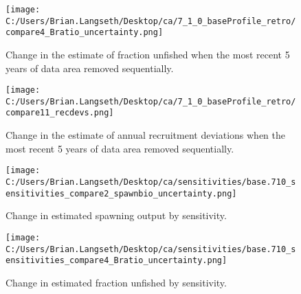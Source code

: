 \documentclass[11pt,
  english,
  a4paper,
]{article}
\begin{document}
\tagmcend\tagstructend


\begin{figure}
\centering
\texttt{[image: C:/Users/Brian.Langseth/Desktop/ca/7\_1\_0\_baseProfile\_retro/compare4\_Bratio\_uncertainty.png]}
\caption{Change in the estimate of fraction unfished when the most recent 5 years of data area removed sequentially.\label{fig:retro-depl}}
\end{figure}

\tagmcend\tagstructend


\begin{figure}
\centering
\texttt{[image: C:/Users/Brian.Langseth/Desktop/ca/7\_1\_0\_baseProfile\_retro/compare11\_recdevs.png]}
\caption{Change in the estimate of annual recruitment deviations when the most recent 5 years of data area removed sequentially.\label{fig:retro-recdevs}}
\end{figure}

\tagmcend\tagstructend


\begin{figure}
\centering
\texttt{[image: C:/Users/Brian.Langseth/Desktop/ca/sensitivities/base.710\_sensitivities\_compare2\_spawnbio\_uncertainty.png]}
\caption{Change in estimated spawning output by sensitivity.\label{fig:sens-ssb}}
\end{figure}

\tagmcend\tagstructend


\begin{figure}
\centering
\texttt{[image: C:/Users/Brian.Langseth/Desktop/ca/sensitivities/base.710\_sensitivities\_compare4\_Bratio\_uncertainty.png]}
\caption{Change in estimated fraction unfished by sensitivity.\label{fig:sens-depl}}
\end{figure}
\end{document}
